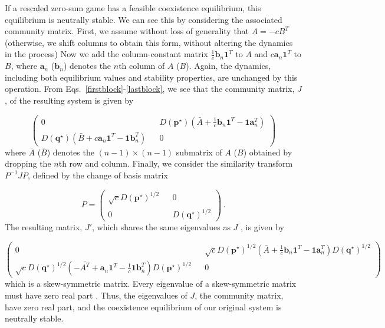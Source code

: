 \documentclass[11pt]{article}
\begin{document}
If a rescaled zero-sum game has a feasible coexistence equilibrium, this equilibrium is neutrally stable. We can see this by considering the associated community matrix. First, we assume without loss of generality that $A = -c B^T$ (otherwise, we shift columns to obtain this form, without altering the dynamics in the process) Now we add the column-constant matrix $\frac{1}{c} \bm{b}_n \bm{1}^T$ to $A$ and $c \bm{a}_n \bm{1}^T$ to $B$, where $\bm{a}_n$ ($\bm{b}_n$) denotes the $n$th column of $A$ ($B$). Again, the dynamics, including both equilibrium values and stability properties, are unchanged by this operation. From Eqs.~\ref{firstblock}-\ref{lastblock}, we see that the community matrix, $J$, of the resulting system is given by

\begin{equation}
\begin{pmatrix}
	0 && D(\bm{p}^\star) (\bar{A} + \frac{1}{c} \bm{b}_n \bm{1}^T - \bm{1} \bm{a}_n^T) \\
	D(\bm{q}^\star) (\bar{B} + c \bm{a}_n \bm{1}^T - \bm{1} \bm{b}_n^T) && 0
\end{pmatrix}
\end{equation}
where $\bar{A}$ ($\bar{B}$) denotes the $(n-1) \times (n-1)$ submatrix of $A$ ($B$) obtained by dropping the $n$th row and column. Finally, we consider the similarity transform $P^{-1} J P$, defined by the change of basis matrix 

\begin{equation}
P = \begin{pmatrix}
	\sqrt{c} D(\bm{p}^\star)^{1/2} && 0 \\
	0 && D(\bm{q}^\star)^{1/2}
\end{pmatrix} \, .
\end{equation}
The resulting matrix, $J'$, which shares the same eigenvalues as $J$ \citep{horn2012matrix}, is given by

\begin{equation}
\begin{pmatrix}
0 && \sqrt{c} D(\bm{p}^\star)^{1/2} (\bar{A} + \frac{1}{c} \bm{b}_n \bm{1}^T - \bm{1} \bm{a}_n^T) D(\bm{q}^\star)^{1/2} \\
\sqrt{c} D(\bm{q}^\star)^{1/2} (-\bar{A^T} + \bm{a}_n \bm{1}^T - \frac{1}{c} \bm{1} \bm{b}_n^T) D(\bm{p}^\star)^{1/2} && 0
\end{pmatrix}
\end{equation}
which is a skew-symmetric matrix. Every eigenvalue of a skew-symmetric matrix must have zero real part \citep{horn2012matrix}. Thus, the eigenvalues of $J$, the community matrix, have zero real part, and the coexistence equilibrium of our original system is neutrally stable. 
\end{document}
